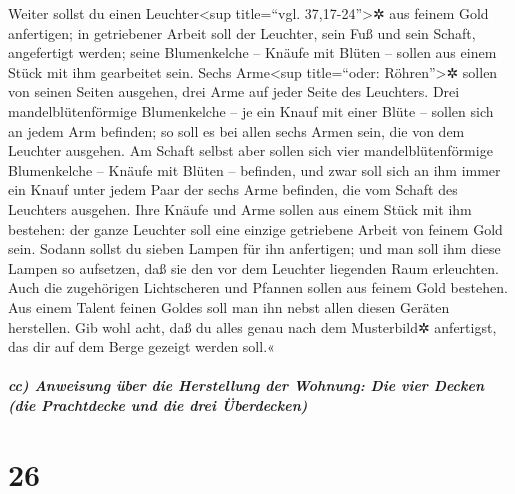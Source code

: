  Weiter sollst du einen Leuchter\textless sup
title=``vgl. 37,17-24''\textgreater✲ aus feinem Gold anfertigen; in
getriebener Arbeit soll der Leuchter, sein Fuß und sein Schaft,
angefertigt werden; seine Blumenkelche -- Knäufe mit Blüten -- sollen
aus einem Stück mit ihm gearbeitet sein.  Sechs
Arme\textless sup title=``oder: Röhren''\textgreater✲ sollen von seinen
Seiten ausgehen, drei Arme auf jeder Seite des Leuchters.
 Drei mandelblütenförmige Blumenkelche -- je ein Knauf
mit einer Blüte -- sollen sich an jedem Arm befinden; so soll es bei
allen sechs Armen sein, die von dem Leuchter ausgehen. 
Am Schaft selbst aber sollen sich vier mandelblütenförmige Blumenkelche
-- Knäufe mit Blüten -- befinden,  und zwar soll sich an
ihm immer ein Knauf unter jedem Paar der sechs Arme befinden, die vom
Schaft des Leuchters ausgehen.  Ihre Knäufe und Arme
sollen aus einem Stück mit ihm bestehen: der ganze Leuchter soll eine
einzige getriebene Arbeit von feinem Gold sein.  Sodann
sollst du sieben Lampen für ihn anfertigen; und man soll ihm diese
Lampen so aufsetzen, daß sie den vor dem Leuchter liegenden Raum
erleuchten.  Auch die zugehörigen Lichtscheren und
Pfannen sollen aus feinem Gold bestehen.  Aus einem
Talent feinen Goldes soll man ihn nebst allen diesen Geräten herstellen.
 Gib wohl acht, daß du alles genau nach dem Musterbild✲
anfertigst, das dir auf dem Berge gezeigt werden soll.«

\hypertarget{cc-anweisung-uxfcber-die-herstellung-der-wohnung-die-vier-decken-die-prachtdecke-und-die-drei-uxfcberdecken}{%
\subparagraph{cc) Anweisung über die Herstellung der Wohnung: Die vier
Decken (die Prachtdecke und die drei
Überdecken)}\label{cc-anweisung-uxfcber-die-herstellung-der-wohnung-die-vier-decken-die-prachtdecke-und-die-drei-uxfcberdecken}}

\hypertarget{section-25}{%
\section{26}\label{section-25}}

